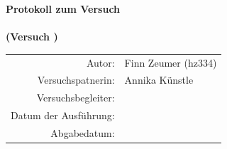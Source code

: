 \begin{titlepage}
\vspace*{2cm} 
  
  \centering
    
  {\LARGE\bfseries Protokoll zum Versuch \\[0.2cm]
  \textit{\versuchsname{\versuchsnummer}} \\[0.5cm] %
  {\large (Versuch {\versuchsnummer})}
  \vspace{1cm}}

  {\large
  \begin{tabular}{@{}rl@{}}
    Autor:                  & Finn Zeumer (hz334)\\
    Versuchspatnerin:        & Annika Künstle\\[0.5em]
    Versuchsbegleiter:      & {\begleiter{\versuchsnummer}}\\[0.5em]
    Datum der Ausführung:   & {\durchfuehrungsdatum{\versuchsnummer}}\\
    \small{Abgabedatum:}    & \small{\abgabedatum{\versuchsnummer}}\\
  \end{tabular}
  }
  \vfill


  
\end{titlepage}